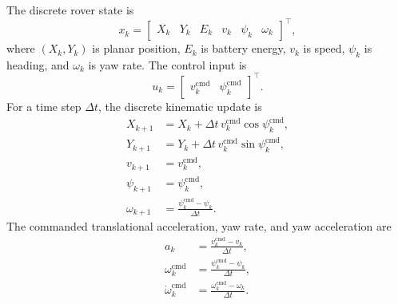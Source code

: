 \documentclass[conf]{new-aiaa}
\begin{document}
The discrete rover state is
\begin{equation}
    x_k = \begin{bmatrix} X_k & Y_k & E_k & v_k & \psi_k & \omega_k \end{bmatrix}^{\top},
\end{equation}
where $(X_k,Y_k)$ is planar position, $E_k$ is battery energy, $v_k$ is speed, $\psi_k$ is heading, and $\omega_k$ is yaw rate. The control input is
\begin{equation}
    u_k = \begin{bmatrix} v_k^{\mathrm{cmd}} & \psi_k^{\mathrm{cmd}} \end{bmatrix}^{\top}.
\end{equation}
For a time step $\Delta t$, the discrete kinematic update is
\begin{align}
    X_{k+1} &= X_k + \Delta t\, v_k^{\mathrm{cmd}}\cos\psi_k^{\mathrm{cmd}}, \\
    Y_{k+1} &= Y_k + \Delta t\, v_k^{\mathrm{cmd}}\sin\psi_k^{\mathrm{cmd}}, \\
    v_{k+1} &= v_k^{\mathrm{cmd}}, \\
    \psi_{k+1} &= \psi_k^{\mathrm{cmd}}, \\
    \omega_{k+1} &= \frac{\psi_k^{\mathrm{cmd}}-\psi_k}{\Delta t}.
\end{align}
The commanded translational acceleration, yaw rate, and yaw acceleration are
\begin{align}
    a_k &= \frac{v_k^{\mathrm{cmd}}-v_k}{\Delta t}, \\
    \omega_k^{\mathrm{cmd}} &= \frac{\psi_k^{\mathrm{cmd}}-\psi_k}{\Delta t}, \\
    \dot{\omega}_k^{\mathrm{cmd}} &= \frac{\omega_k^{\mathrm{cmd}}-\omega_k}{\Delta t}.
\end{align}
\end{document}
